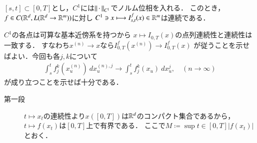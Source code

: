 \begin{screen}
	\begin{thm}[$I_{s,t}$は$x$に関し連続]\label{thm:T_s_t_continuous_w_r_t_C1_norm}
		$[s,t] \subset [0,T]$とし，$C^1$には$\left\|\, \cdot\, \right\|_{C^1}$でノルム位相を入れる．
		このとき，$f \in C(\mathbb{R}^d,L(\mathbb{R}^d \rightarrow \mathbb{R}^m))$に対し
		$C^1 \ni x \longmapsto I^f_{s,t}(x) \in \mathbb{R}^m$は連続である．
	\end{thm}
\end{screen}

\begin{prf}
	$C^1$の各点は可算な基本近傍系を持つから
	$x \longmapsto I_{0,T}(x)$の点列連続性と連続性は一致する．
	すなわち$x^{(n)} \longrightarrow x$なら$I^f_{0,T}(x^{(n)}) \longrightarrow I^f_{0,T}(x)$
	が従うことを示せばよい．今回も各$j,k$について
	\begin{align}
		\int_s^t f^k_j(x^{(n)}_u)\ dx^{(n),j}_u
		\longrightarrow \int_s^t f^k_j(x_u)\ dx^j_u,
		\quad (n \longrightarrow \infty)
		\label{eq:thm_T_s_t_continuous_w_r_t_C1_norm}
	\end{align}
	が成り立つことを示せば十分である．
	\begin{description}
		\item[第一段] $t \longmapsto x_t$の連続性より$x([0,T])$は$\mathbb{R}^d$のコンパクト集合であるから，
			$t \longmapsto f(x_t)$は$[0,T]$上で有界である．
			ここで$M \coloneqq \sup{t \in [0,T]}{|f(x_t)|}$とおく．
			

\end{description}
\end{prf}
